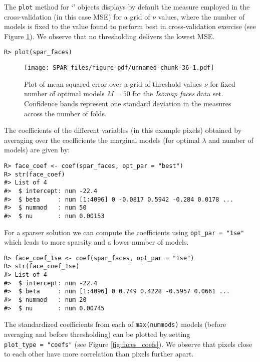 \documentclass[
  article]{jss}
\newcommand{\class}[1]{`\code{#1}'}
\begin{document}
The \texttt{plot} method for \class{spar.cv} objects displays by default
the measure employed in the cross-validation (in this case MSE) for a
grid of \(\nu\) values, where the number of models is fixed to the value
found to perform best in cross-validation exercise (see Figure
\ref{fig:facesplot_valmeasure}). We observe that no thresholding
delivers the lowest MSE.

\begin{verbatim}
R> plot(spar_faces)
\end{verbatim}

\begin{figure}[H]

{\centering \texttt{[image: SPAR\_files/figure-pdf/unnamed-chunk-36-1.pdf]}

}

\caption{Plot of mean squared error over a grid of threshold values
\(\nu\) for fixed number of optimal models \(M=50\) for the
\emph{Isomap faces} data set. Confidence bands represent one standard
deviation in the measures across the number of folds.
\label{fig:facesplot_valmeasure}}

\end{figure}%

The coefficients of the different variables (in this example pixels)
obtained by averaging over the coefficients the marginal models (for
optimal \(\lambda\) and number of models) are given by:

\begin{verbatim}
R> face_coef <- coef(spar_faces, opt_par = "best")
R> str(face_coef)
#> List of 4
#>  $ intercept: num -22.4
#>  $ beta     : num [1:4096] 0 -0.0817 0.5942 -0.284 0.0178 ...
#>  $ nummod   : num 50
#>  $ nu       : num 0.00153
\end{verbatim}

For a sparser solution we can compute the coefficients using
\texttt{opt\_par\ =\ "1se"} which leads to more sparsity and a lower
number of models.

\begin{verbatim}
R> face_coef_1se <- coef(spar_faces, opt_par = "1se")
R> str(face_coef_1se)
#> List of 4
#>  $ intercept: num -22.4
#>  $ beta     : num [1:4096] 0 0.749 0.4228 -0.5957 0.0661 ...
#>  $ nummod   : num 20
#>  $ nu       : num 0.00745
\end{verbatim}

The standardized coefficients from each of \texttt{max(nummods)} models
(before averaging and before thresholding) can be plotted by setting
\texttt{plot\_type\ =\ "coefs"} (see Figure \ref{fig:faces_coefs}). We
observe that pixels close to each other have more correlation than
pixels further apart.
\end{document}
